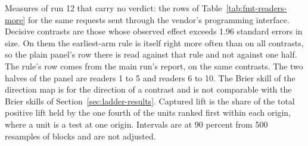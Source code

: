 \begin{table}[t]\centering\footnotesize
\caption{Measures of run 12 that carry no verdict: the rows of Table~\ref{tab:fmt-readers-more} for the same requests sent through the vendor's programming interface. Decisive contrasts are those whose observed effect exceeds 1.96 standard errors in size. On them the earliest-arm rule is itself right more often than on all contrasts, so the plain panel's row there is read against that rule and not against one half. The rule's row comes from the main run's report, on the same contrasts. The two halves of the panel are readers 1 to 5 and readers 6 to 10. The Brier skill of the direction map is for the direction of a contrast and is not comparable with the Brier skills of Section~\ref{sec:ladder-results}. Captured lift is the share of the total positive lift held by the one fourth of the units ranked first within each origin, where a unit is a test at one origin. Intervals are at 90 percent from 500 resamples of blocks and are not adjusted.}
\label{tab:fmt-readers-more-api}

\end{table}

